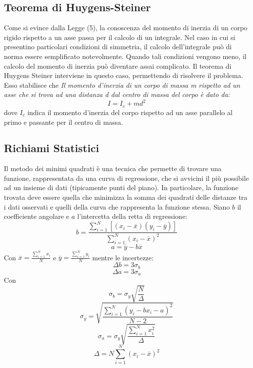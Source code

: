 \subsection{Teorema di Huygens-Steiner}
Come si evince dalla Legge (5), la conoscenza del momento di inerzia di un corpo rigido rispetto a un asse passa per il calcolo di un integrale. Nel caso in cui si presentino particolari condizioni di simmetria, il calcolo dell'integrale può di norma essere semplificato notevolmente. Quando tali condizioni vengono meno, il calcolo del momento di inerzia può diventare assai complicato. Il teorema di Huygens Steiner interviene in questo caso, permettendo di risolvere il problema. Esso stabilisce che \emph{Il momento d'inerzia di un corpo di massa m rispetto ad un asse che si trova ad una distanza d  dal centro di massa del corpo è dato da:}
\begin{equation}
    I = I_c + md^2
\end{equation}
dove $I_c$ indica il momento d'inerzia del corpo rispetto ad un asse parallelo al primo e passante per il centro di massa. 

\subsection{Richiami Statistici}
Il metodo dei minimi quadrati è una tecnica che permette di trovare una funzione, rappresentata da una curva di regressione, che si avvicini il più possibile ad un insieme di dati (tipicamente punti del piano). In particolare, la funzione trovata deve essere quella che minimizza la somma dei quadrati delle distanze tra i dati osservati e quelli della curva che rappresenta la funzione stessa. Siano $b$ il coefficiente angolare e $a$ l'intercetta della retta di regressione:
\begin{equation}
	b=\frac{\displaystyle\sum_{i=1}^{N}[(x_i-\overline{x})(y_i-\overline{y})]}{\displaystyle\sum_{i=1}^{N}(x_i-\overline{x})^2}
\end{equation}
\begin{equation}
	a=\overline{y}-b\overline{x}
\end{equation}
Con $\overline{x}=\frac{\displaystyle\sum_{i=1}^{N}x_i}{N}$ e $\overline{y}=\frac{\displaystyle\sum_{i=1}^{N}y_i}{N}$
mentre le incertezze:
\begin{equation}
	\Delta b=3\sigma_b
\end{equation}
\begin{equation}
	\Delta a=3\sigma_a
\end{equation}
Con $$\sigma_b=\sigma_y\sqrt{\frac{N}{\Delta}}$$
$$\sigma_y=\sqrt{\frac{\displaystyle\sum_{i=1}^{N}(y_i-bx_i-a)^2}{N-2}}$$
$$\sigma_a=\sigma_y\sqrt{\frac{\displaystyle\sum_{i=1}^{N}x_i^2}{\Delta}}$$
$$\Delta=N\displaystyle\sum_{i=1}^{N}(x_i-\overline{x})^2$$

